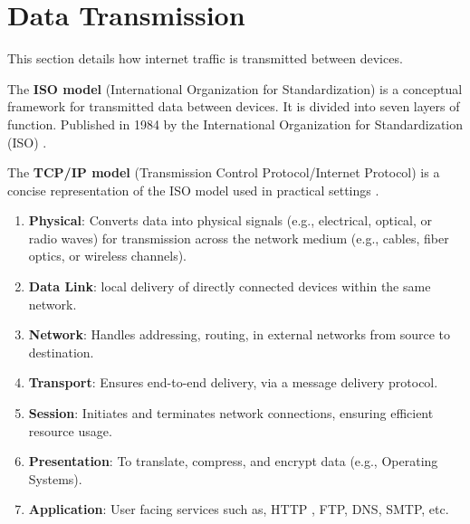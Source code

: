 \section{Data Transmission}
This section details how internet traffic is transmitted between devices.
\begin{Def}

    The \textbf{ISO model} (International Organization for Standardization) is a conceptual framework for transmitted data between devices. 
    It is divided into seven layers of function\cite{ibm_osi_model}. Published in 1984 by the International Organization for Standardization (ISO) \cite{kanade_osi_model}.

\end{Def}
\begin{Def}

    The \textbf{TCP/IP model} (Transmission Control Protocol/Internet Protocol)
    is a concise representation of the ISO model used in practical settings \cite{yasar_tcpip}.
\end{Def}

\newpage


\begin{Def}

    \begin{enumerate}
        \item \textbf{Physical}: Converts data into physical signals (e.g., electrical, optical, or radio waves) for transmission across the network medium (e.g., cables, fiber optics, or wireless channels).
        \item \textbf{Data Link}: local delivery of directly connected devices within the same network.
        \item \textbf{Network}: Handles addressing, routing, in external networks from source to destination.
        \item \textbf{Transport}: Ensures end-to-end delivery, via a message delivery protocol.
        \item \textbf{Session}: Initiates and terminates network connections, ensuring efficient resource usage.
        \item \textbf{Presentation}: To translate, compress, and encrypt data  (e.g., Operating Systems).
        \item \textbf{Application}: User facing services such as, HTTP , FTP, DNS, SMTP, etc.
    \end{enumerate}
    \hfill \cite{leonard_osi_model}\cite{Rayes2022}
\end{Def}

